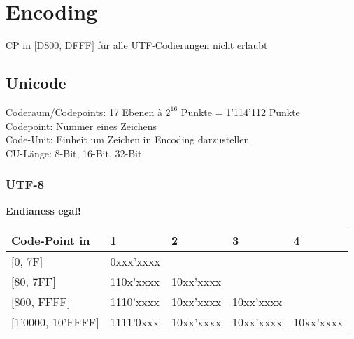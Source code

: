 \section{Encoding}
CP in $[$D800, DFFF$]$ für alle UTF-Codierungen nicht erlaubt

\subsection{Unicode}
Coderaum/Codepoints: 17 Ebenen à $2^{16}$ Punkte = 1'114'112 Punkte\\
Codepoint: Nummer eines Zeichens\\
Code-Unit: Einheit um Zeichen in Encoding darzustellen\\
CU-Länge: 8-Bit, 16-Bit, 32-Bit


\subsubsection{UTF-8}
\textbf{Endianess egal!}

\begin{tabular}{lllll}
  Code-Point in & 1 & 2 & 3 & 4 \\
  \hline
  $[$0, 7F$]$ & 0xxx'xxxx & & & \\
  $[$80, 7FF$]$ & 110x'xxxx & 10xx'xxxx & & \\
  $[$800, FFFF$]$ & 1110'xxxx & 10xx'xxxx & 10xx'xxxx & \\
  $[$1'0000, 10'FFFF$]$ & 1111'0xxx & 10xx'xxxx & 10xx'xxxx & 10xx'xxxx \\
\end{tabular}\\

